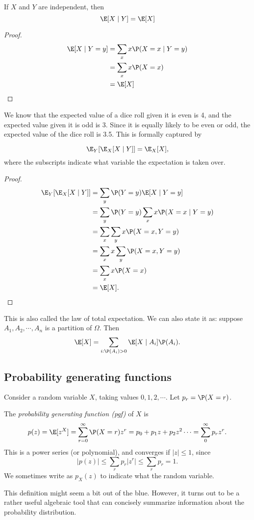 \documentclass[a4paper]{article}
\begin{document}
\begin{thm}
  If $X$ and $Y$ are independent, then
  \[
    \E[X\mid Y] = \E[X]
  \]
\end{thm}

\begin{proof}
  \begin{align*}
    \E[X\mid Y = y] &= \sum_{x}x\P(X = x\mid Y = y)\\
    &= \sum_x x\P(X = x)\\
    &= \E[X]
  \end{align*}
\end{proof}

We know that the expected value of a dice roll given it is even is 4, and the expected value given it is odd is 3. Since it is equally likely to be even or odd, the expected value of the dice roll is 3.5. This is formally captured by
\begin{thm}
  \[
    \E_Y[\E_X[X\mid Y]] = \E_X[X],
  \]
  where the subscripts indicate what variable the expectation is taken over.
\end{thm}

\begin{proof}
  \begin{align*}
    \E_Y[\E_X[X\mid Y]] &= \sum_y \P(Y = y)\E[X\mid Y = y]\\
    &= \sum _y \P(Y = y) \sum_{x}x\P(X = x\mid Y = y)\\
    &= \sum_x\sum_y x\P(X = x, Y = y)\\
    &= \sum _x x\sum_y \P(X = x, Y = y)\\
    &= \sum_x x\P(X = x)\\
    &= \E[X].
  \end{align*}
\end{proof}
This is also called the law of total expectation. We can also state it as: suppose $A_1, A_2, \cdots, A_n$ is a partition of $\Omega$. Then
\[
  \E[X] = \sum_{i: \P(A_i) > 0}\E[X\mid A_i]\P(A_i).
\]

\subsection{Probability generating functions}
Consider a random variable $X$, taking values $0, 1, 2, \cdots$. Let $p_r = \P(X = r)$.
\begin{defi}
  The \emph{probability generating function (pgf)} of $X$ is
  \[
    p(z) = \E[z^X] = \sum_{r = 0}^\infty \P(X = r)z^r = p_0 + p_1z + p_2z^2\cdots = \sum_0^\infty p_rz^r.
  \]
  This is a power series (or polynomial), and converges if $|z| \leq 1$, since
  \[
    |p(z)| \leq \sum_r p_r |z^r| \leq \sum_r p_r = 1.
  \]
  We sometimes write as $p_X(z)$ to indicate what the random variable.
\end{defi}
This definition might seem a bit out of the blue. However, it turns out to be a rather useful algebraic tool that can concisely summarize information about the probability distribution.
\end{document}
